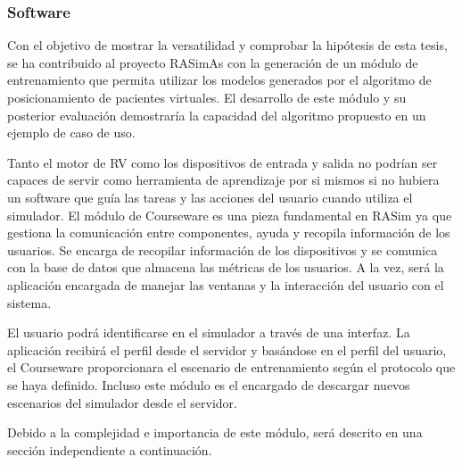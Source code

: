 \subsubsection{Software}

Con el objetivo de mostrar la versatilidad y comprobar la hipótesis de esta tesis, se ha contribuido al proyecto \ac{RASimAs} con la generación de un módulo de entrenamiento que permita utilizar los modelos generados por el algoritmo de posicionamiento de pacientes virtuales. El desarrollo de este módulo y su posterior evaluación demostraría la capacidad del algoritmo propuesto en un ejemplo de caso de uso.

Tanto el motor de \ac{RV} como los dispositivos de entrada y salida no podrían ser capaces de servir como herramienta de aprendizaje por si mismos si no hubiera un software que guía las tareas y las acciones del usuario cuando utiliza el simulador.
El módulo de \ac{Courseware} es una pieza fundamental en \ac{RASim} ya que gestiona la comunicación entre componentes, ayuda y recopila información de los usuarios. Se encarga de recopilar información de los dispositivos y se comunica con la base de datos que almacena las métricas de los usuarios. A la vez, será la aplicación encargada de manejar las ventanas y la interacción del usuario con el sistema. 

El usuario podrá identificarse en el simulador a través de una interfaz. La aplicación recibirá el perfil desde el servidor y basándose en el perfil del usuario, el \ac{Courseware} proporcionara el escenario de entrenamiento según el protocolo que se haya definido. Incluso este módulo es el encargado de descargar nuevos escenarios del simulador desde el servidor. 

Debido a la complejidad e importancia de este módulo, será descrito en una sección independiente a continuación.

